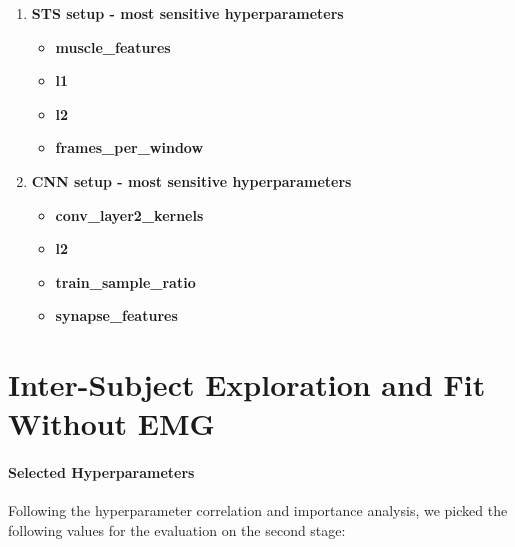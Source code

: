 \begin{enumerate}
    \item \textbf{STS setup - most sensitive hyperparameters}
    \begin{itemize}
        \item \textbf{muscle\_features}
        \item \textbf{l1}
        \item \textbf{l2}
        \item \textbf{frames\_per\_window}
    \end{itemize}

    \item \textbf{CNN setup - most sensitive hyperparameters}
    \begin{itemize}
        \item \textbf{conv\_layer2\_kernels}
        \item \textbf{l2}
        \item \textbf{train\_sample\_ratio}
        \item \textbf{synapse\_features}
    \end{itemize}
\end{enumerate}

\section{Inter-Subject Exploration and Fit Without EMG}

\paragraph{Selected Hyperparameters}

Following the hyperparameter correlation and importance analysis, we picked the following values for the evaluation on the second stage:

